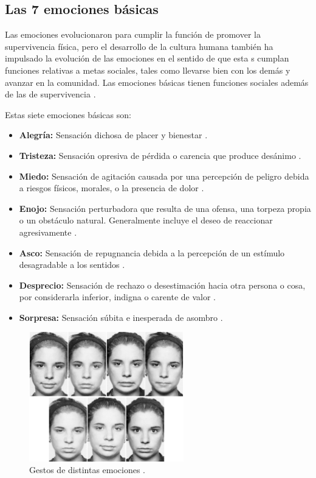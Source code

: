 \subsection*{Las 7 emociones básicas}
Las emociones evolucionaron para cumplir la función de promover la supervivencia física, pero el desarrollo de la cultura humana también ha impulsado la evolución de las emociones en el sentido de que esta
s cumplan funciones relativas a metas sociales, tales como llevarse bien con los demás y avanzar en la comunidad. Las emociones básicas tienen funciones sociales además de las de supervivencia \cite{rulicki2012cnv}.

Estas siete emociones básicas son:
\begin{itemize}
\item \textbf{Alegría:} Sensación dichosa de placer y bienestar \cite{rulicki2012cnv}.
\item \textbf{Tristeza:} Sensación opresiva de pérdida o carencia que produce desánimo \cite{rulicki2012cnv}.
\item \textbf{Miedo:} Sensación de agitación causada por una percepción de peligro debida a riesgos físicos, morales, o la presencia de dolor \cite{rulicki2012cnv}.
\item \textbf{Enojo:} Sensación perturbadora que resulta de una ofensa, una torpeza propia o un obstáculo natural. Generalmente incluye el deseo de reaccionar agresivamente \cite{rulicki2012cnv}.
\item \textbf{Asco:} Sensación de repugnancia debida a la percepción de un estímulo desagradable a los sentidos \cite{rulicki2012cnv}.
\item \textbf{Desprecio:} Sensación de rechazo o desestimación hacia otra persona o cosa, por considerarla inferior, indigna o carente de valor \cite{rulicki2012cnv}.
\item \textbf{Sorpresa:} Sensación súbita e inesperada de asombro \cite{rulicki2012cnv}.
\end{itemize}

\begin{figure}[h]
    \centering
    \includegraphics[width=0.6\textwidth]{Emociones.png}
    \caption{Gestos de distintas emociones \cite{ekman2017rostro}.}
    \label{fig:Emociones}
\end{figure}


